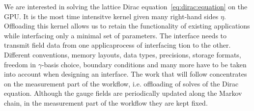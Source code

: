 


We are interested in solving the lattice Dirac equation~\cref{eq:dirac:equation} on the GPU.
It is the most time intensitve kernel given many right-hand sides $\eta$.
Offloading this kernel allows us to retain the functionality of existing applications while interfacing only a minimal set of parameters.
The interface needs to transmit field data from one applicaprocess of interfacing tion to the other.
Different conventions, memory layouts, data types, precisions, storage formats, freedom in $\gamma$-basis choice, boundary conditions and many more have to be taken into account when designing an interface.
The work that will follow concentrates on the measurement part of the workflow, i.e. offloading of solves of the Dirac equation.
Although the gauge fields are periodically updated along the Markov chain, in the measurement part of the workflow they are kept fixed.

